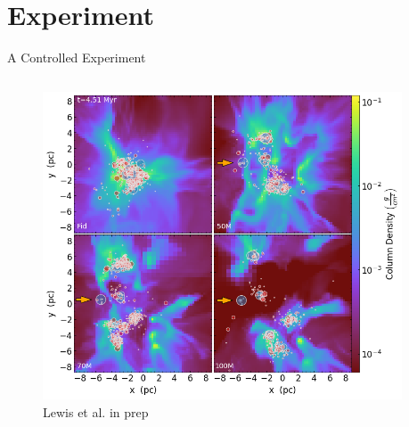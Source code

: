 \documentclass[aspectratio=169]{beamer}
\begin{document}
\section{Experiment}
\begin{frame}{A Controlled Experiment}{}
    \begin{columns}
        \begin{column}{0.45\textwidth}
            \begin{figure}[h!]
                \centering
                \includegraphics[width=\linewidth]{../images/density_grid.png} \\
                Lewis et al. in prep
                \label{fig:density}
            \end{figure}
        \end{column}
        \begin{column}{0.38\textwidth}
            

\end{column}
\end{columns}
\end{frame}
\end{document}
